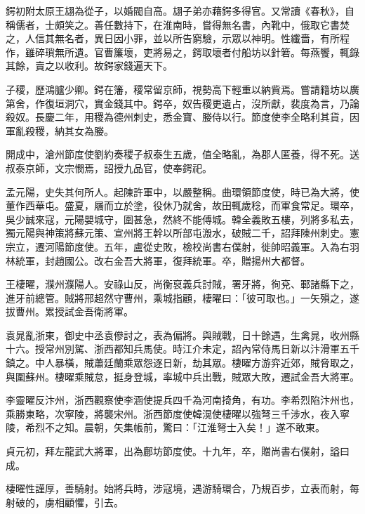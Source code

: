 \begin{pinyinscope}
 鍔初附太原王翃為從子，以婚閥自高。翃子弟亦藉鍔多得官。又常讀《春秋》，自稱儒者，士頗笑之。善任數持下，在淮南時，嘗得無名書，內靴中，俄取它書焚之，人信其無名者，異日因小罪，並以所告窮驗，示眾以神明。性纖嗇，有所程作，雖碎瑣無所遺。官曹簾壞，吏將易之，鍔取壞者付船坊以針箬。每燕饗，輒錄其餘，賣之以收利。故鍔家錢遍天下。



 子稷，歷鴻臚少卿。鍔在籓，稷常留京師，視勢高下輕重以納貲焉。嘗請籍坊以廣第舍，作復垣洞穴，實金錢其中。鍔卒，奴告稷更遺占，沒所獻，裴度為言，乃論殺奴。長慶二年，用稷為德州刺史，悉金寶、媵侍以行。節度使李全略利其貨，因軍亂殺稷，納其女為媵。



 開成中，滄州節度使劉約奏稷子叔泰生五歲，值全略亂，為郡人匿養，得不死。送叔泰京師，文宗憫焉，詔授九品官，使奉鍔祀。



 孟元陽，史失其何所人。起陳許軍中，以嚴整稱。曲環領節度使，時已為大將，使董作西華屯。盛夏，屩而立於塗，役休乃就舍，故田輒歲稔，而軍食常足。環卒，吳少誠來寇，元陽嬰城守，圍甚急，然終不能傅城。韓全義敗五樓，列將多私去，獨元陽與神策將蘇元策、宣州將王幹以所部屯溵水，破賊二千，詔拜陳州刺史。憲宗立，遷河陽節度使。五年，盧從史敗，檢校尚書右僕射，徙帥昭義軍。入為右羽林統軍，封趙國公。改右金吾大將軍，復拜統軍。卒，贈揚州大都督。



 王棲曜，濮州濮陽人。安祿山反，尚衡裒義兵討賊，署牙將，徇兗、鄆諸縣下之，進牙前總管。賊將邢超然守曹州，乘城指顧，棲曜曰：「彼可取也。」一矢殞之，遂拔曹州。累授試金吾衛將軍。



 袁晁亂浙東，御史中丞袁傪討之，表為偏將。與賊戰，日十餘遇，生禽晁，收州縣十六。授常州別駕、浙西都知兵馬使。時江介未定，詔內常侍馬日新以汴滑軍五千鎮之。中人暴橫，賊蕭廷蘭乘眾怨逐日新，劫其眾。棲曜方游弈近郊，賊脅取之，與圍蘇州。棲曜乘賊怠，挺身登城，率城中兵出戰，賊眾大敗，遷試金吾大將軍。



 李靈曜反汴州，浙西觀察使李涵使提兵四千為河南掎角，有功。李希烈陷汴州也，乘勝東略，次寧陵，將襲宋州。浙西節度使韓滉使棲曜以強弩三千涉水，夜入寧陵，希烈不之知。晨朝，矢集帳前，驚曰：「江淮弩士入矣！」遂不敢東。



 貞元初，拜左龍武大將軍，出為鄜坊節度使。十九年，卒，贈尚書右僕射，謚曰成。



 棲曜性謹厚，善騎射。始將兵時，涉寇境，遇游騎環合，乃規百步，立表而射，每射破的，虜相顧懼，引去。




\end{pinyinscope}

